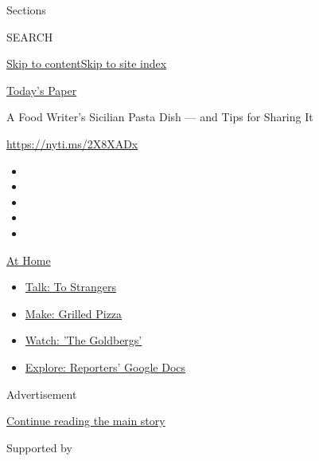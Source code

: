 Sections

SEARCH

\protect\hyperlink{site-content}{Skip to
content}\protect\hyperlink{site-index}{Skip to site index}

\href{https://myaccount.nytimes.com/auth/login?response_type=cookie\&client_id=vi}{}

\href{https://www.nytimes.com/section/todayspaper}{Today's Paper}

A Food Writer's Sicilian Pasta Dish --- and Tips for Sharing It

\url{https://nyti.ms/2X8XADx}

\begin{itemize}
\item
\item
\item
\item
\item
\end{itemize}

\href{https://www.nytimes.com/spotlight/at-home?action=click\&pgtype=Article\&state=default\&region=TOP_BANNER\&context=at_home_menu}{At
Home}

\begin{itemize}
\tightlist
\item
  \href{https://www.nytimes.com/2020/08/03/well/family/the-benefits-of-talking-to-strangers.html?action=click\&pgtype=Article\&state=default\&region=TOP_BANNER\&context=at_home_menu}{Talk:
  To Strangers}
\item
  \href{https://www.nytimes.com/2020/08/01/at-home/coronavirus-make-pizza-on-a-grill.html?action=click\&pgtype=Article\&state=default\&region=TOP_BANNER\&context=at_home_menu}{Make:
  Grilled Pizza}
\item
  \href{https://www.nytimes.com/2020/07/31/arts/television/goldbergs-abc-stream.html?action=click\&pgtype=Article\&state=default\&region=TOP_BANNER\&context=at_home_menu}{Watch:
  'The Goldbergs'}
\item
  \href{https://www.nytimes.com/interactive/2020/at-home/even-more-reporters-editors-diaries-lists-recommendations.html?action=click\&pgtype=Article\&state=default\&region=TOP_BANNER\&context=at_home_menu}{Explore:
  Reporters' Google Docs}
\end{itemize}

Advertisement

\protect\hyperlink{after-top}{Continue reading the main story}

Supported by

